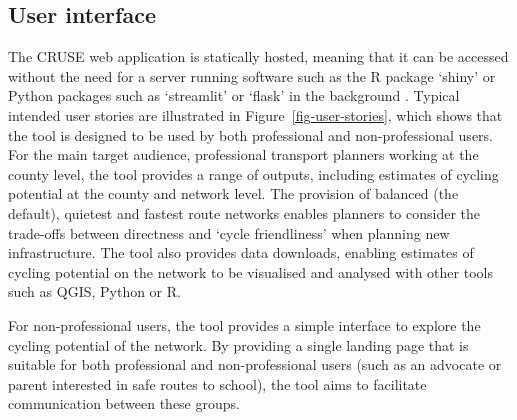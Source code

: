 \documentclass[
  super,
  preprint,
  3p]{elsarticle}
\begin{document}
\hypertarget{sec-ui}{%
\subsection{User interface}\label{sec-ui}}

The CRUSE web application is statically hosted, meaning that it can be
accessed without the need for a server running software such as the R
package `shiny' or Python packages such as `streamlit' or `flask' in the
background \citep{wickham2021}. Typical intended user stories are
illustrated in Figure~\ref{fig-user-stories}, which shows that the tool
is designed to be used by both professional and non-professional users.
For the main target audience, professional transport planners working at
the county level, the tool provides a range of outputs, including
estimates of cycling potential at the county and network level. The
provision of balanced (the default), quietest and fastest route networks
enables planners to consider the trade-offs between directness and
`cycle friendliness' when planning new infrastructure. The tool also
provides data downloads, enabling estimates of cycling potential on the
network to be visualised and analysed with other tools such as QGIS,
Python or R.

For non-professional users, the tool provides a simple interface to
explore the cycling potential of the network. By providing a single
landing page that is suitable for both professional and non-professional
users (such as an advocate or parent interested in safe routes to
school), the tool aims to facilitate communication between these groups.
\end{document}
